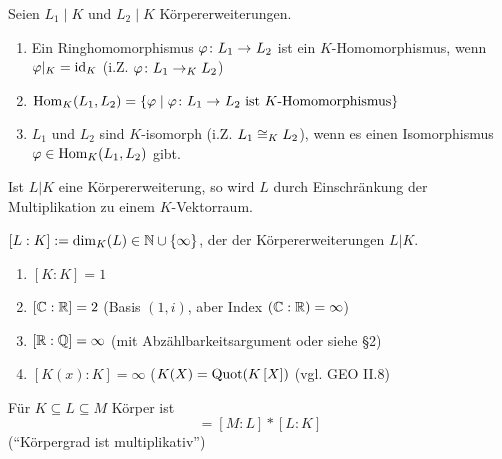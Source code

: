 \begin{definition}[$K$-Homomorphismus]
    Seien $L_1 \mid K$ und $L_2 \mid K$ Körpererweiterungen.
    \begin{enumerate}[nolistsep, leftmargin=*]
        \item Ein Ringhomomorphismus $\abb{\phi}{L_1}{L_2}$ ist ein $K$-Homomorphismus, wenn $\varphi |_K = \operatorname{id}_K$ (i.Z. $\abb{\phi}{L_1}[K]{L_2}$)
        \item $\Hom_K(L_1,L_2) = \set{\phi \mid \abb{\phi}{L_1}{L_2} \text{ ist $K$-Homomorphismus}}$
        \item $L_1$ und $L_2$ sind $K$-isomorph (i.Z. $L_1 \mathrel{\cong}_K L_2$), wenn es einen Isomorphismus $\varphi \in \operatorname{Hom}_K(L_1, L_2)$ gibt.
    \end{enumerate}
\end{definition}

\begin{bemerkung}
    Ist $L | K$ eine Körpererweiterung, so wird $L$ durch Einschränkung der Multiplikation zu einem $K$-Vektorraum.
\end{bemerkung}

\begin{definition}[Körpergrad]
    $[L:K]\mathrel{:=} \dim_K(L) \in \mathbb{N} \cup \left\{ \infty \right\}$, der  der Körpererweiterungen $L | K$.
\end{definition}

\begin{beispiel}
    \begin{enumerate}[label=(\alph*), leftmargin=*]
        \item $[K: K] = 1$
        \item $[\mathbb{C}:\mathbb{R}] = 2$ (Basis $(1,i)$, aber Index $(\mathbb{C}:\mathbb{R}) = \infty$)
        \item $[\mathbb{R}:\mathbb{Q}] = \infty$ (mit Abzählbarkeitsargument oder siehe §2)
        \item $[K(x):K] = \infty$ ($K(X) = \Quot(\polynom[K])$ (vgl. GEO II.8)
    \end{enumerate}
\end{beispiel}

\begin{satz}
    Für $K \subseteq L \subseteq M$ Körper ist 
    \begin{equation*}
        [M:K] = [M:L] * [L:K]
    \end{equation*}
    (``Körpergrad ist multiplikativ'')
\end{satz}


